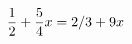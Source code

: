 \documentclass[preview]{standalone}
\begin{document}
\begin{align*}
\special{dvisvgm:raw <g id='unique000'>}\frac{1}{2} + \frac{5}{4}x = 2/3 + 9x\special{dvisvgm:raw </g>}
\end{align*}
\end{document}
